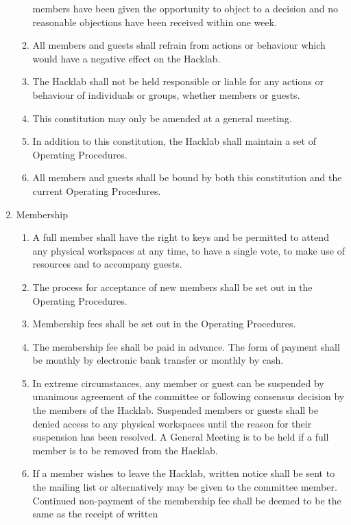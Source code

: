 \documentclass{article}
\begin{document}
\begin{enumerate}
\begin{enumerate}
      members have been given the opportunity to object to a decision
      and no reasonable objections have been received within one week.
    \item All members and guests shall refrain from actions or
      behaviour which would have a negative effect on the Hacklab.
    \item The Hacklab shall not be held responsible or liable for
      any actions or behaviour of individuals or groups, whether
      members or guests.
    \item This constitution may only be amended at a general meeting.
    \item In addition to this constitution, the Hacklab shall maintain
      a set of Operating Procedures.
    \item All members and guests shall be bound by both this
      constitution and the current Operating Procedures.
    \end{enumerate} %
  \item Membership
    \begin{enumerate}
    \item A full member shall have the right to keys and be permitted
      to attend any physical workspaces at any time, to have a single
      vote, to make use of resources and to accompany guests.
    \item The process for acceptance of new members shall be set out
      in the Operating Procedures.
    \item Membership fees shall be set out in the Operating Procedures. 
    \item The membership fee shall be paid in advance. The form of
      payment shall be monthly by electronic bank transfer or monthly
      by cash.
    \item \cbstart In extreme circumstances, any member or guest can
      be suspended by unanimous agreement of the committee or following
      consensus decision by the members of the Hacklab. Suspended
      members or guests shall be denied access to any physical
      workspaces until the reason for their suspension has been
      resolved. A General Meeting is to be held if a full member is to
      be removed from the Hacklab.\cbend
    \item If a member wishes to leave the Hacklab, written notice
      shall be sent to the mailing list or alternatively may be given
      to the committee member. Continued non-payment of the membership
      fee shall be deemed to be the same as the receipt of written

\end{enumerate}
\end{enumerate}
\end{document}
